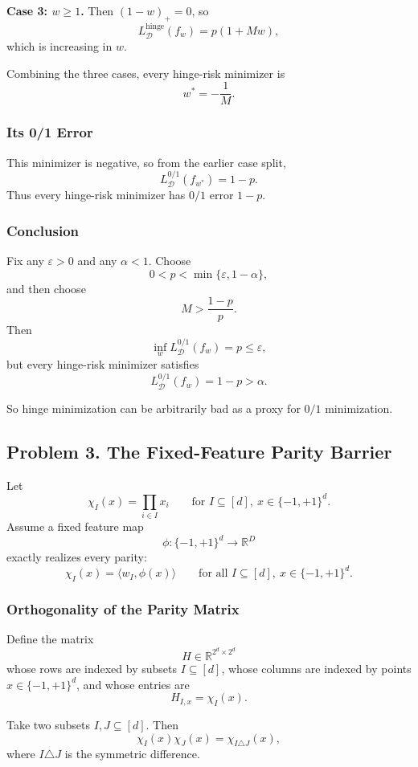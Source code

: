 \documentclass{article}
\newcommand{\cD}{\mathcal{D}}
\begin{document}
\textbf{Case 3: $w\ge 1$.}
Then $(1-w)_+=0$, so
$$
L_{\cD}^{\mathrm{hinge}}(f_w)=p(1+Mw),
$$
which is increasing in $w$.

Combining the three cases, every hinge-risk minimizer is
$$
w^*=-\frac{1}{M}.
$$

\subsubsection{Its 0/1 Error}

This minimizer is negative, so from the earlier case split,
$$
L_{\cD}^{0/1}(f_{w^*})=1-p.
$$
Thus every hinge-risk minimizer has $0/1$ error $1-p$.

\subsubsection{Conclusion}

Fix any $\varepsilon>0$ and any $\alpha<1$. Choose
$$
0<p<\min\{\varepsilon,1-\alpha\},
$$
and then choose
$$
M>\frac{1-p}{p}.
$$
Then
$$
\inf_w L_{\cD}^{0/1}(f_w)=p\le \varepsilon,
$$
but every hinge-risk minimizer satisfies
$$
L_{\cD}^{0/1}(f_w)=1-p>\alpha.
$$

So hinge minimization can be arbitrarily bad as a proxy for $0/1$ minimization.

\subsection{Problem 3. The Fixed-Feature Parity Barrier}

Let
$$
\chi_I(x)=\prod_{i\in I} x_i
\qquad
\text{for } I\subseteq[d],\ x\in\{-1,+1\}^d.
$$
Assume a fixed feature map
$$
\phi:\{-1,+1\}^d \to \mathbb{R}^D
$$
exactly realizes every parity:
$$
\chi_I(x)=\langle w_I,\phi(x)\rangle
\qquad
\text{for all } I\subseteq[d],\ x\in\{-1,+1\}^d.
$$

\subsubsection{Orthogonality of the Parity Matrix}

Define the matrix
$$
H\in \mathbb{R}^{2^d\times 2^d}
$$
whose rows are indexed by subsets $I\subseteq[d]$, whose columns are indexed by points $x\in\{-1,+1\}^d$, and whose entries are
$$
H_{I,x}=\chi_I(x).
$$

Take two subsets $I,J\subseteq[d]$. Then
$$
\chi_I(x)\chi_J(x)=\chi_{I\triangle J}(x),
$$
where $I\triangle J$ is the symmetric difference.
\end{document}
